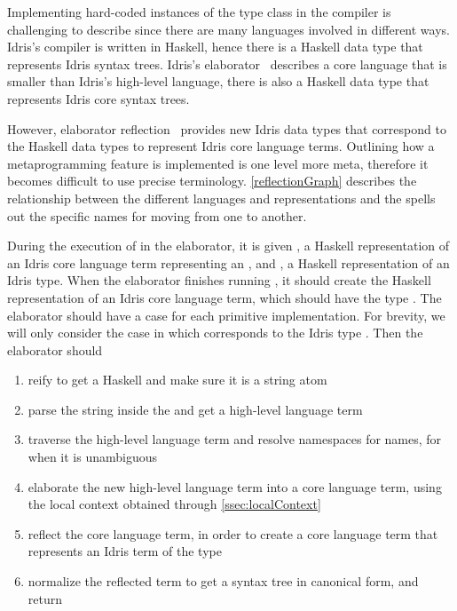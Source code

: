Implementing hard-coded instances of the \Editorable{} type class in the
compiler is challenging to describe since there are many languages involved in
different ways. Idris's compiler is written in Haskell, hence there is a
Haskell data type that represents Idris syntax trees. Idris's
elaborator~\citep{idris} describes a core language that is smaller than Idris's
high-level language, there is also a Haskell data type that represents Idris
core syntax trees.

However, elaborator reflection~\citep{davidphd, elabref} provides new Idris
data types that correspond to the Haskell data types to represent Idris core
language terms.
Outlining how a metaprogramming feature is implemented is one level more meta,
therefore it becomes difficult to use precise terminology.
\autoref{reflectionGraph} describes the relationship between the different
languages and representations and the spells out the specific names for moving
from one to another.

During the execution of  in the elaborator, it is given
, a Haskell representation of an Idris core language term representing
an \sexp{}, and , a Haskell representation of an Idris type.
When the elaborator finishes running , it should create
the Haskell representation of an Idris core language term, which should have the
type . The elaborator should have a case for each primitive
\Editorable{} implementation. For brevity, we will only consider the case in
which  corresponds to the Idris type \TT{}. Then the elaborator should

\begin{enumerate}
  \item reify  to get a Haskell \sexp{} and make sure it is a string atom
  \item parse the string inside the \sexp{} and get a high-level language term
  \item traverse the high-level language term and resolve namespaces for names, for when it is unambiguous
  \item elaborate the new high-level language term into a core language term, using the local context obtained through \autoref{ssec:localContext}
  \item reflect the core language term, in order to create a core language term that represents an Idris term of the type \TT{}
  \item normalize the reflected term to get a syntax tree in canonical form, and return
\end{enumerate}

